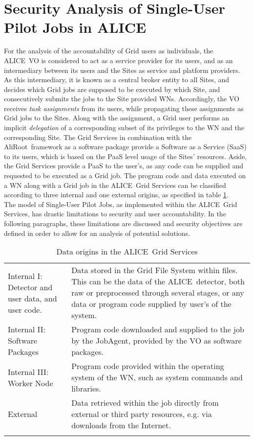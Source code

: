 \documentclass[10pt]{iopart}
\newcommand{\alice}{ALICE}
\newcommand{\aliroot}{AliRoot}
\begin{document}
\section{Security Analysis of Single-User Pilot Jobs in \alice}
\label{secsupj}
For the analysis of the accountability of Grid users as individuals,
the \alice\ VO is considered to act as a service provider for its users, and as an
intermediary between its users and the Sites as service and platform providers.
As this intermediary, it is known as a central broker entity to all Sites,
and decides which Grid jobs are supposed to be executed by which Site, and
consecutively submits the jobs to the Site provided WNs. 
Accordingly, the VO
receives \textit{task assignments} from its users, while propagating these
assignments as Grid jobs to the Sites. Along with the assignment, a Grid user
performs an implicit \textit{delegation} of a corresponding subset of its
privileges to the WN and the corresponding Site. The Grid Services in
combination with the \aliroot\ framework as a software package provide a
Software as a Service (SaaS) to its users, which is based on the PaaS level usage of
the Sites' resources.
Aside, the Grid Services provide a PaaS to the user's, as any code can be
supplied and requested to be executed as a Grid job. The
program code and data executed on a WN along with a Grid job in the \alice\ Grid
Services can be classified according to three internal and one external
origins, as specified in table \ref{dataorigins}.\\
The model of Single-User
Pilot Jobs, as implemented within the \alice\ Grid Services, has
drastic limitations to security and user accountability. In the following
paragraphs, these limitations are discussed and security objectives are defined
in order to allow for an analysis of potential solutions.
\begin{table}[h]
\begin{center}
\begin{tabular}{p{} p{}}
\hline
\noalign{\medskip}
Internal I: Detector and user data, and user code.
& Data stored in the Grid File System within files. This can be the data
of the \alice\ detector, both raw or preprocessed through several
stages, or any data or program code supplied by user's of the
system.\\
\noalign{\bigskip}
Internal II: Software Packages
& Program code downloaded and supplied to the job by
the JobAgent, provided by the VO as software packages.\\
\noalign{\bigskip}
Internal III: Worker Node
& Program code provided within the operating system of the WN, such as
system commands and libraries.\\
\noalign{\bigskip}
External
& Data retrieved within the job directly from external or third party
resources, e.g. via downloads from the Internet.\\
\noalign{\medskip}\hline
\end{tabular}
\caption{\label{dataorigins}Data origins in the \alice\ Grid Services}
\end{center}
\end{table}
\end{document}
